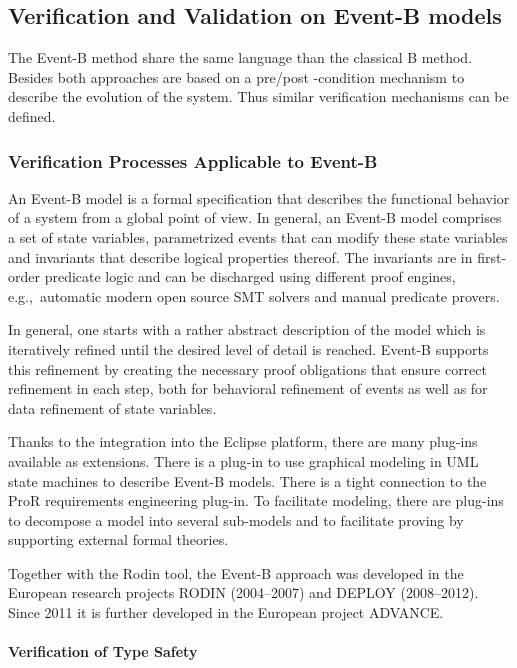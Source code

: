 \subsection{Verification and Validation on Event-B models}

The Event-B method share the same language than the classical  B method. Besides both approaches are based on a pre/post -condition mechanism to describe the evolution of the system. Thus similar verification mechanisms can be defined.


\subsubsection{Verification Processes Applicable to Event-B}
\label{sec:verif-proc-appl}

An Event-B model is a formal specification that describes the functional
behavior of a system from a global point of view. In general, an Event-B model
comprises a set of state variables, parametrized events that can modify these
state variables and invariants that describe logical properties thereof.  The
invariants are in first-order predicate logic and can be discharged using
different proof engines, e.g.,\  automatic modern open source SMT solvers and
manual predicate provers.

In general, one starts with a rather abstract description of the model which is
iteratively refined until the desired level of detail is reached. Event-B
supports this refinement by creating the necessary proof obligations that ensure
correct refinement in each step, both for behavioral refinement of events as
well as for data refinement of state variables.

Thanks to the integration into the Eclipse platform, there are many plug-ins
available as extensions. There is a plug-in to use graphical modeling in UML
state machines to describe Event-B models. There is a tight connection to the
ProR requirements engineering plug-in. To facilitate modeling, there are
plug-ins to decompose a model into several sub-models and to facilitate proving
by supporting external formal theories.

Together with the Rodin tool, the Event-B approach was developed in the European
research projects RODIN (2004--2007) and DEPLOY (2008--2012). Since 2011 it is
further developed in the European project ADVANCE\@.

\paragraph{Verification of Type Safety}
\label{sec:verif-type-safety}

